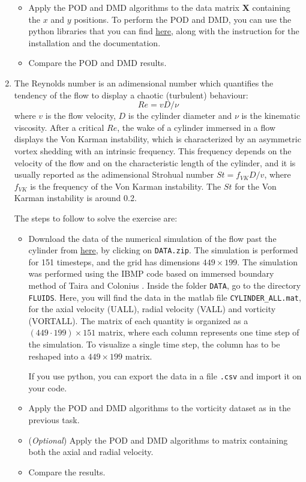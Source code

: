 \documentclass[11pt]{article}
\begin{document}
\begin{enumerate}[start=1,label={\bfseries Task \arabic*:}]
\begin{itemize}
\item Apply the POD and DMD algorithms to the data matrix $\mathbf{X}$ containing the $x$ and $y$ positions. To perform the POD and DMD, you can use the python libraries that you can find \href{https://github.com/mendezVKI/MODULO}{here}, along with the instruction for the installation and the documentation.
\item Compare the POD and DMD results. 
\end{itemize}
\item The Reynolds number is an adimensional number which quantifies the tendency of the flow to display a chaotic (turbulent) behaviour:
\begin{equation}
Re = v D/ \nu
\end{equation}
where $v$ is the flow velocity, $D$ is the cylinder diameter and $\nu$ is the kinematic viscosity. After a critical $Re$, the wake of a cylinder immersed in a flow displays the Von Karman instability, which is characterized by an asymmetric vortex shedding with an intrinsic frequency. This frequency depends on the velocity of the flow and on the characteristic length of the cylinder, and it is usually reported as the adimensional Strohual number $St = f_{VK} D/ v$, where $f_{VK}$ is the frequency of the Von Karman instability. The $St$ for the Von Karman instability is around 0.2.\par
The steps to follow to solve the exercise are:
\begin{itemize}
\item Download the data of the numerical simulation of the flow past the cylinder from \href{http://dmdbook.com/}{here}, by clicking on \verb|DATA.zip|. The simulation is performed for 151 timesteps, and the grid has dimensions $449 \times 199 $. The simulation was performed using the IBMP code based on immersed boundary method of Taira and Colonius \cite{Taira2007}.
Inside the folder \verb|DATA|, go to the directory \verb|FLUIDS|. Here, you will find the data in the matlab file \verb|CYLINDER_ALL.mat|, for the axial velocity (UALL), radial velocity (VALL) and vorticity (VORTALL). The matrix of each quantity is organized as a $(449 \cdot 199) \times 151 $ matrix, where each column represents one time step of the simulation. To visualize a single time step, the column has to be reshaped into a $449 \times 199$ matrix. \par 
If you use python, you can export the data in a file \verb|.csv| and import it on your code.  
\item Apply the POD and DMD algorithms to the vorticity dataset as in the previous task.
\item (\textit{Optional}) Apply the POD and DMD algorithms to matrix containing both the axial and radial velocity.
\item Compare the results.

\end{itemize}
\end{enumerate}
\end{document}
